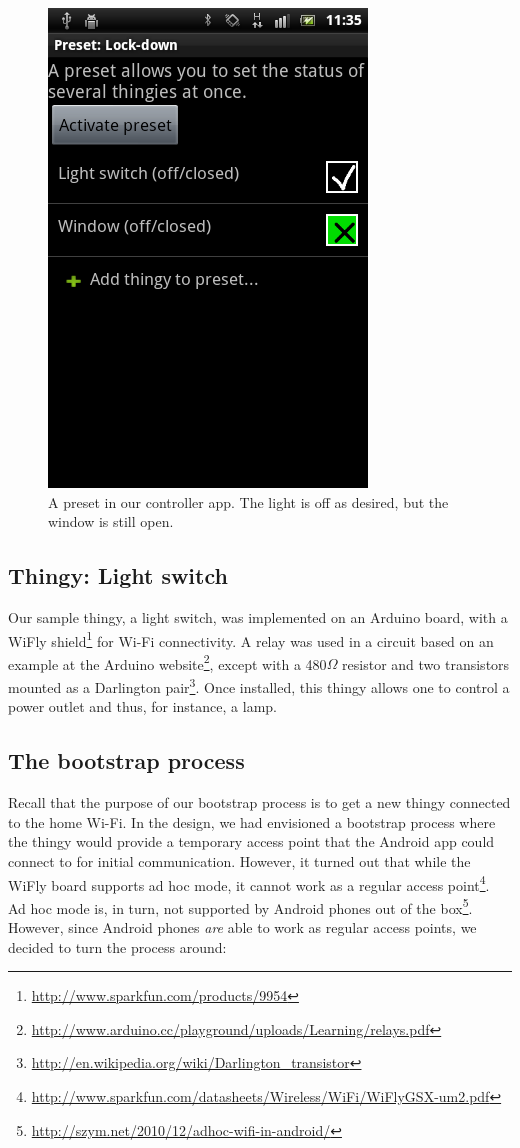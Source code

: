 \documentclass{ubicomp2012}
\begin{document}
\begin{figure}[th]
\begin{center}
\includegraphics[width=0.45\columnwidth]{figures/home-remote-preset.png}
\end{center}
\caption{A preset in our controller app. The light is off as desired, but the window is still open.}
\label{fig:homeRemotePresets}
\end{figure}

\subsection{Thingy: Light switch}

Our sample thingy, a light switch, was implemented on an Arduino board, with a WiFly shield\footnote{\url{http://www.sparkfun.com/products/9954}} for Wi-Fi connectivity. A relay was used in a circuit based on an example at the Arduino website\footnote{\url{http://www.arduino.cc/playground/uploads/Learning/relays.pdf}}, except with a 480$\Omega$ resistor and two transistors mounted as a Darlington pair\footnote{\url{http://en.wikipedia.org/wiki/Darlington_transistor}}. Once installed, this thingy allows one to control a power outlet and thus, for instance, a lamp.
\subsection{The bootstrap process}

Recall that the purpose of our bootstrap process is to get a new thingy connected to the home Wi-Fi. In the design, we had envisioned a bootstrap process where the thingy would provide a temporary access point that the Android app could connect to for initial communication. However, it turned out that while the WiFly board supports ad hoc mode, it cannot work as a regular access point\footnote{\url{http://www.sparkfun.com/datasheets/Wireless/WiFi/WiFlyGSX-um2.pdf}}. Ad hoc mode is, in turn, not supported by Android phones out of the box\footnote{\url{http://szym.net/2010/12/adhoc-wifi-in-android/}}. However, since Android phones \emph{are} able to work as regular access points, we decided to turn the process around:
\end{document}
